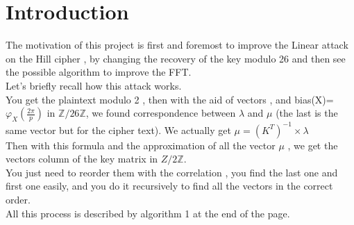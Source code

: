 \documentclass{article}
\begin{document}

\section{Introduction}
	The motivation of this project is first and foremost to improve the Linear attack on the Hill cipher , by changing the recovery of the key modulo 26 and then see the possible algorithm to improve the FFT.\\
Let's briefly recall how this attack works.\\
You get the plaintext modulo 2 , then with the aid of vectors , and bias(X)= $\varphi_{X}(\frac{2\pi}{p})$ in $\mathbb{Z}/26\mathbb{Z}$, we found correspondence between $\lambda$ and $\mu$ (the last is the same vector but for the cipher text). We actually get $ \mu = (K^T)^{-1} \times\lambda $\\
Then with this formula and the approximation of all the vector $\mu$ , we get the vectors column of the key matrix in ${Z}/2\mathbb{Z}$.\\
You just need to reorder them with the correlation , you find the last one and first one easily, and you do it recursively to find all the vectors in the correct order.\\
All this process is described by algorithm 1 at the end of the page.\\
\end{document}
